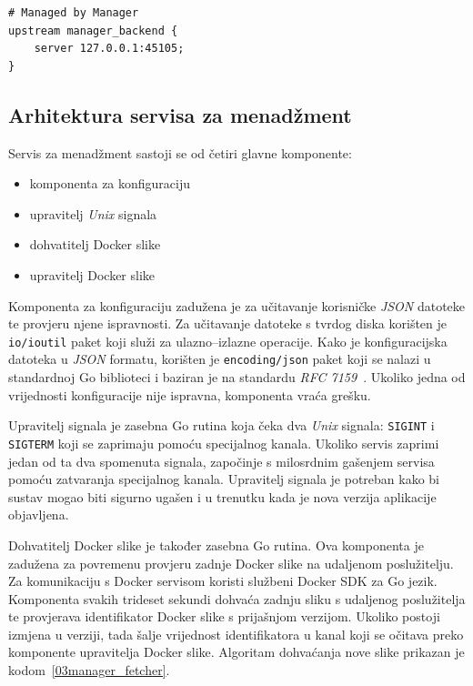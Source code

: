 \begin{lstlisting}[float=h]
# Managed by Manager
upstream manager_backend {
    server 127.0.0.1:45105;
}
\end{lstlisting}

\subsection{Arhitektura servisa za menadžment}
Servis za menadžment sastoji se od četiri glavne komponente:
\begin{itemize}
    \item komponenta za konfiguraciju
    \item upravitelj \textit{Unix} signala
    \item dohvatitelj Docker slike
    \item upravitelj Docker slike
\end{itemize}

Komponenta za konfiguraciju zadužena je za učitavanje korisničke \textit{JSON} datoteke te provjeru
njene ispravnosti. Za učitavanje datoteke s tvrdog diska korišten je \texttt{io/ioutil} paket koji
služi za ulazno--izlazne operacije. Kako je konfiguracijska datoteka u \textit{JSON} formatu,
korišten je \texttt{encoding/json} paket koji se nalazi u standardnoj Go biblioteci i baziran je na
standardu \textit{RFC 7159}~\citep{bray2017javascript}. Ukoliko jedna od vrijednosti konfiguracije
nije ispravna, komponenta vraća grešku.

Upravitelj signala je zasebna Go rutina koja čeka dva \textit{Unix} signala: \texttt{SIGINT} i
\texttt{SIGTERM} koji se zaprimaju pomoću specijalnog kanala. Ukoliko servis zaprimi jedan od ta dva
spomenuta signala, započinje s milosrdnim gašenjem servisa pomoću zatvaranja specijalnog kanala.
Upravitelj signala je potreban kako bi sustav mogao biti sigurno ugašen i u trenutku kada je nova
verzija aplikacije objavljena.

Dohvatitelj Docker slike je također zasebna Go rutina. Ova komponenta je zadužena za povremenu
provjeru zadnje Docker slike na udaljenom poslužitelju. Za komunikaciju s Docker servisom koristi
službeni Docker SDK za Go jezik. Komponenta svakih trideset sekundi dohvaća zadnju sliku s
udaljenog poslužitelja te provjerava identifikator Docker slike s prijašnjom verzijom. Ukoliko
postoji izmjena u verziji, tada šalje vrijednost identifikatora u kanal koji se očitava preko
komponente upravitelja Docker slike. Algoritam dohvaćanja nove slike prikazan je
kodom~\ref{03manager_fetcher}.


